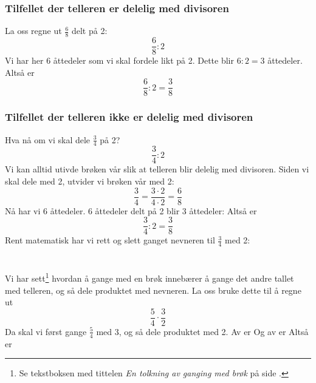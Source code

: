 \subsubsection{Tilfellet der telleren er delelig med divisoren}
La oss regne ut $ \frac{6}{8} $ delt på 2:
\[ \frac{6}{8}:2 \]
Vi har her 6 åttedeler som vi skal fordele likt på 2. Dette blir $ 6:2=3 $ åttedeler.
Altså er
\[ \frac{6}{8}:2=\frac{3}{8} \]
\newpage
\subsubsection{Tilfellet der telleren ikke er delelig med divisoren}
Hva nå om vi skal dele $ \frac{3}{4} $ på 2? 
\[ \frac{3}{4}:2 \]
Vi kan alltid utivde brøken vår slik at telleren blir delelig med divisoren. Siden vi skal dele med 2, utvider vi brøken vår med 2:
\[ \frac{3}{4}=\frac{3\cdot2}{4\cdot2}=\frac{6}{8} \]
Nå har vi 6 åttedeler. 6 åttedeler delt på 2 blir 3 åttedeler:
Altså er
\[ \frac{3}{4}:2=\frac{3}{8} \]
Rent matematisk har vi rett og slett ganget nevneren til $ \frac{3}{4} $ med 2:
\section{\brgngbr \label{brgngbr}}		
Vi har sett\footnote{Se tekstboksen med tittelen \textit{En tolkning av ganging med brøk} på side \pageref{brtolk}.} hvordan å gange med en brøk innebærer å gange det andre tallet med telleren, og så dele produktet med nevneren. La oss bruke dette til å regne ut
\[  {\frac{5}{4}\cdot\frac{3}{2}}\] 
Da skal vi først gange $ \frac{5}{4} $ med 3, og så dele produktet med 2. Av  er
Og av  er
Altså er 
\reg[\brtbr\label{brtbr}]{
Når vi ganger to brøker med hverandre, ganger vi teller med teller og nevner med nevner.
}
\newpage
